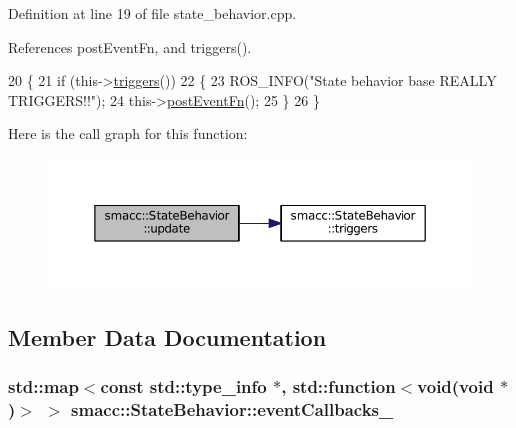 Definition at line 19 of file state\+\_\+behavior.\+cpp.



References post\+Event\+Fn, and triggers().


\begin{DoxyCode}
20 \{
21     \textcolor{keywordflow}{if} (this->\hyperlink{classsmacc_1_1StateBehavior_a29fc4e24391c977f8686424326b3b70f}{triggers}())
22     \{
23         ROS\_INFO(\textcolor{stringliteral}{"State behavior base REALLY TRIGGERS!!"});
24         this->\hyperlink{classsmacc_1_1StateBehavior_aa8485f8a68716ca9429ac8e72e057b7c}{postEventFn}();
25     \}
26 \}
\end{DoxyCode}


Here is the call graph for this function\+:
\nopagebreak
\begin{figure}[H]
\begin{center}
\leavevmode
\includegraphics[width=350pt]{classsmacc_1_1StateBehavior_a5aa08609fe8095513e762ae40ca4884b_cgraph}
\end{center}
\end{figure}




\subsection{Member Data Documentation}
\subsubsection[{\texorpdfstring{event\+Callbacks\+\_\+}{eventCallbacks_}}]{\setlength{\rightskip}{0pt plus 5cm}std\+::map$<$const std\+::type\+\_\+info $\ast$, std\+::function$<$void(void $\ast$)$>$ $>$ smacc\+::\+State\+Behavior\+::event\+Callbacks\+\_\+}\hypertarget{classsmacc_1_1StateBehavior_acbe54c0be9466094565c5b47ab53d84b}{}\label{classsmacc_1_1StateBehavior_acbe54c0be9466094565c5b47ab53d84b}


